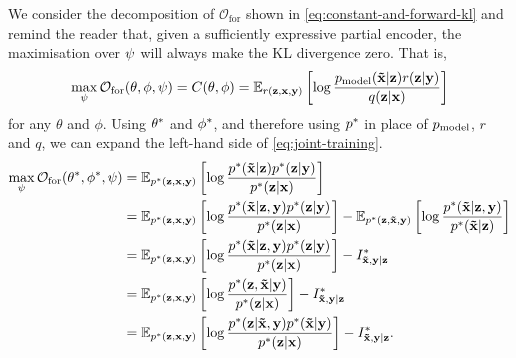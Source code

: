 
We consider the decomposition of $\mathcal{O}_\mathrm{for}$ shown in
\cref{eq:constant-and-forward-kl} and remind the reader that, given a
sufficiently expressive partial encoder, the maximisation over $\psi$ will
always make the KL divergence zero. That is,
\begin{equation}
  \max_{\psi{}} \mathcal{O}_\mathrm{for}(\theta, \phi, \psi{}) = C(\theta, \phi) = \mathbb{E}_{r(\mathbf{z}{},\mathbf{x}{},\mathbf{y}{})} \left[ \log \frac{p_{\rm{model}}{}(\mathbf{\tilde{x}}{}|\mathbf{z}{})r(\mathbf{z}{}|\mathbf{y}{})}{q(\mathbf{z}{}|\mathbf{x}{})} \right] \label{eq:forward-max-phi}
\end{equation}
for any $\theta$ and $\phi$. Using ${\theta}^*$ and ${\phi}^*$, and
therefore using ${p}^*{}$ in place of $p_{\rm{model}}{}$, $r$ and $q$, we can expand the
left-hand side of \cref{eq:joint-training}.
\begin{align}
  \max_{\psi{}} \mathcal{O}_\mathrm{for}({\theta}^*, {\phi}^*, \psi{}) &= \mathbb{E}_{{p}^*{}(\mathbf{z}{},\mathbf{x}{},\mathbf{y}{})} \left[ \log \frac{{p}^*{}(\mathbf{\tilde{x}}{}|\mathbf{z}{}){p}^*{}(\mathbf{z}{}|\mathbf{y}{})}{{p}^*(\mathbf{z}{}|\mathbf{x}{})} \right] \\
                                                                                           &= \mathbb{E}_{{p}^*{}(\mathbf{z}{},\mathbf{x}{},\mathbf{y}{})} \left[ \log \frac{{p}^*{}(\mathbf{\tilde{x}}{}|\mathbf{z}{},\mathbf{y}{}){p}^*{}(\mathbf{z}{}|\mathbf{y}{})}{{p}^*(\mathbf{z}{}|\mathbf{x}{})} \right] - \mathbb{E}_{{p}^*{}(\mathbf{z}{},\mathbf{\tilde{x}}{},\mathbf{y}{})} \left[ \log\frac{{p}^*{}(\mathbf{\tilde{x}}{}|\mathbf{z}{},\mathbf{y}{})}{{p}^*{}(\mathbf{\tilde{x}}{}|\mathbf{z}{})} \right] \\
                                                                                           &= \mathbb{E}_{{p}^*{}(\mathbf{z}{},\mathbf{x}{},\mathbf{y}{})} \left[ \log \frac{{p}^*{}(\mathbf{\tilde{x}}{}|\mathbf{z}{},\mathbf{y}{}){p}^*{}(\mathbf{z}{}|\mathbf{y}{})}{{p}^*(\mathbf{z}{}|\mathbf{x}{})} \right] - I^*_{\mathbf{\tilde{x}}{},\mathbf{y}{}|\mathbf{z}{}}{}\\
                                                                                           &= \mathbb{E}_{{p}^*{}(\mathbf{z}{},\mathbf{x}{},\mathbf{y}{})} \left[ \log \frac{{p}^*{}(\mathbf{z}{},\mathbf{\tilde{x}}{}|\mathbf{y}{})}{{p}^*(\mathbf{z}{}|\mathbf{x}{})} \right] - I^*_{\mathbf{\tilde{x}}{},\mathbf{y}{}|\mathbf{z}{}}{}\\
                                                                                           &= \mathbb{E}_{{p}^*{}(\mathbf{z}{},\mathbf{x}{},\mathbf{y}{})} \left[ \log \frac{{p}^*{}(\mathbf{z}{}|\mathbf{\tilde{x}}{},\mathbf{y}{}){p}^*{}(\mathbf{\tilde{x}}{}|\mathbf{y}{})}{{p}^*(\mathbf{z}{}|\mathbf{x}{})} \right] - I^*_{\mathbf{\tilde{x}}{},\mathbf{y}{}|\mathbf{z}{}}{}. \label{eq:pre-mapping}
\end{align}
